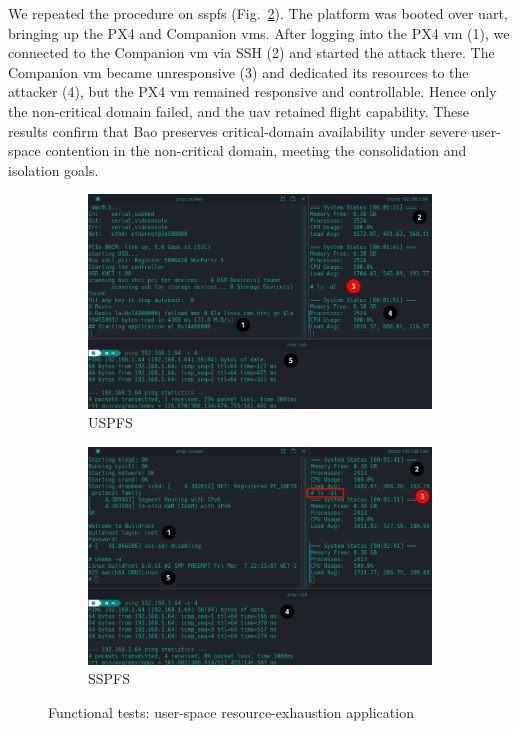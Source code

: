 We repeated the procedure on \gls{sspfs} (Fig.~\ref{fig:user-memhog-test-sspfs}). The platform was booted over \gls{uart}, bringing up the PX4 and Companion \glspl{vm}. After logging into the PX4 \gls{vm} (1), we connected to the Companion \gls{vm} via SSH (2) and started the attack there. The Companion \gls{vm} became unresponsive (3) and dedicated its resources to the attacker (4), but the PX4 \gls{vm} remained responsive and controllable. Hence only the non-critical domain failed, and the \gls{uav} retained flight capability.
%
These results confirm that Bao preserves critical-domain availability under severe user-space contention in the non-critical domain, meeting the consolidation and isolation goals.

\begin{figure}[!hbt]
  \centering
  \begin{subfigure}[t]{0.7\textwidth}
    \centering
    \includegraphics[width=1.0\textwidth]{./img/png/user-memhog-test-annot}
    \caption{USPFS}%
    \label{fig:user-memhog-test-uspfs}
  \end{subfigure}
  \begin{subfigure}[t]{0.7\textwidth}
    \centering
    \includegraphics[width=\linewidth]{./img/png/user-memhog-test-bao-annot}
    \caption{SSPFS}%
    \label{fig:user-memhog-test-sspfs}
  \end{subfigure}
  \caption{Functional tests: user-space resource-exhaustion application}
  \label{fig:user-memhog-test}
\end{figure}

